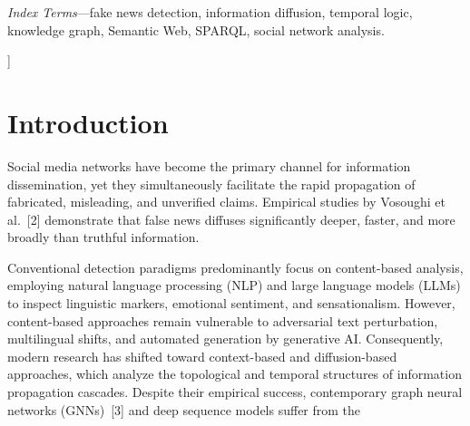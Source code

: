 \documentclass[10pt,twocolumn,a4paper]{article}
\begin{document}
{\begin{@twocolumnfalse}
\begin{center}
\begin{minipage}{0.92\textwidth}
\vspace{4pt}
\noindent\textit{Index Terms}---fake news detection, information diffusion, temporal logic, knowledge graph, Semantic Web, SPARQL, social network analysis.
\end{minipage}
\end{center}
\vspace{10pt}
\end{@twocolumnfalse}
}]
\makeatother
 
\section{Introduction}
Social media networks have become the primary channel for information dissemination, yet they simultaneously facilitate the rapid propagation of fabricated, misleading, and unverified claims. Empirical studies by Vosoughi et al.~[2] demonstrate that false news diffuses significantly deeper, faster, and more broadly than truthful information.
 
Conventional detection paradigms predominantly focus on content-based analysis, employing natural language processing (NLP) and large language models (LLMs) to inspect linguistic markers, emotional sentiment, and sensationalism. However, content-based approaches remain vulnerable to adversarial text perturbation, multilingual shifts, and automated generation by generative AI. Consequently, modern research has shifted toward context-based and diffusion-based approaches, which analyze the topological and temporal structures of information propagation cascades. Despite their empirical success, contemporary graph neural networks (GNNs)~[3] and deep sequence models suffer from the
\end{document}
